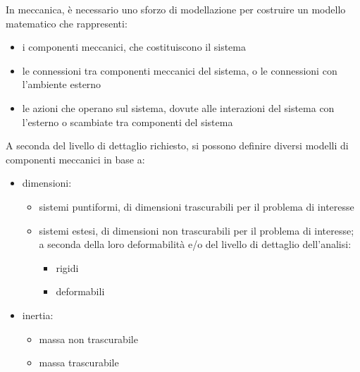\documentclass[letterpaper,10pt,italian]{jupyterBook}
\begin{document}
\sphinxAtStartPar
In meccanica, è necessario uno sforzo di modellazione per costruire un modello matematico che rappresenti:
\begin{itemize}
\item {} 
\sphinxAtStartPar
i componenti meccanici, che costituiscono il sistema

\item {} 
\sphinxAtStartPar
le connessioni tra componenti meccanici del sistema, o le connessioni con l’ambiente esterno

\item {} 
\sphinxAtStartPar
le azioni che operano sul sistema, dovute alle interazioni del sistema con l’esterno o scambiate tra componenti del sistema

\end{itemize}

\sphinxAtStartPar
A seconda del livello di dettaglio richiesto, si possono definire diversi modelli di componenti meccanici in base a:
\begin{itemize}
\item {} 
\sphinxAtStartPar
dimensioni:
\begin{itemize}
\item {} 
\sphinxAtStartPar
sistemi puntiformi, di dimensioni trascurabili per il problema di interesse

\item {} 
\sphinxAtStartPar
sistemi estesi, di dimensioni non trascurabili per il problema di interesse; a seconda della loro deformabilità e/o del livello di dettaglio dell’analisi:
\begin{itemize}
\item {} 
\sphinxAtStartPar
rigidi

\item {} 
\sphinxAtStartPar
deformabili

\end{itemize}

\end{itemize}

\item {} 
\sphinxAtStartPar
inertia:
\begin{itemize}
\item {} 
\sphinxAtStartPar
massa non trascurabile

\item {} 
\sphinxAtStartPar
massa trascurabile

\end{itemize}

\end{itemize}
\end{document}

